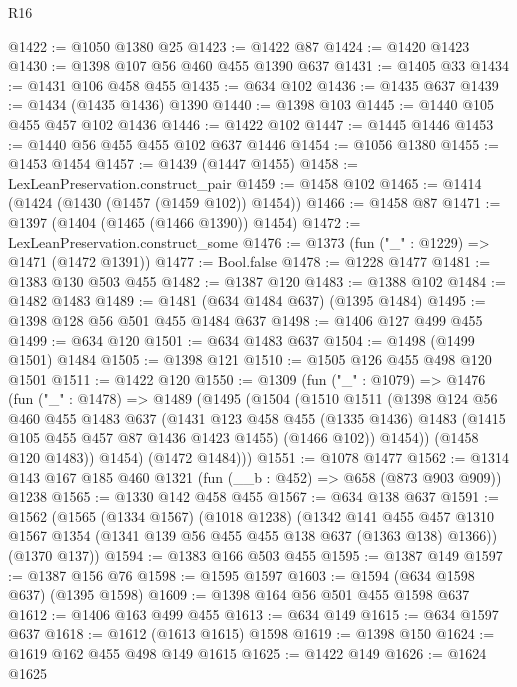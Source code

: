 \begin{lexlean}{R16}
\begin{coremodule}
@1422 := @1050 @1380 @25
@1423 := @1422 @87
@1424 := @1420 @1423
@1430 := @1398 @107 @56 @460 @455 @1390 @637
@1431 := @1405 @33
@1434 := @1431 @106 @458 @455
@1435 := @634 @102
@1436 := @1435 @637
@1439 := @1434 (@1435 @1436) @1390
@1440 := @1398 @103
@1445 := @1440 @105 @455 @457 @102 @1436
@1446 := @1422 @102
@1447 := @1445 @1446
@1453 := @1440 @56 @455 @455 @102 @637 @1446
@1454 := @1056 @1380
@1455 := @1453 @1454
@1457 := @1439 (@1447 @1455)
@1458 := LexLeanPreservation.construct_pair
@1459 := @1458 @102
@1465 := @1414 (@1424 (@1430 (@1457 (@1459 @102)) @1454))
@1466 := @1458 @87
@1471 := @1397 (@1404 (@1465 (@1466 @1390)) @1454)
@1472 := LexLeanPreservation.construct_some
@1476 := @1373 (fun ("_" : @1229) => @1471 (@1472 @1391))
@1477 := Bool.false
@1478 := @1228 @1477
@1481 := @1383 @130 @503 @455
@1482 := @1387 @120
@1483 := @1388 @102
@1484 := @1482 @1483
@1489 := @1481 (@634 @1484 @637) (@1395 @1484)
@1495 := @1398 @128 @56 @501 @455 @1484 @637
@1498 := @1406 @127 @499 @455
@1499 := @634 @120
@1501 := @634 @1483 @637
@1504 := @1498 (@1499 @1501) @1484
@1505 := @1398 @121
@1510 := @1505 @126 @455 @498 @120 @1501
@1511 := @1422 @120
@1550 := @1309
    (fun ("_" : @1079) =>
    @1476
      (fun ("_" : @1478) =>
      @1489
        (@1495
          (@1504
            (@1510
              @1511
              (@1398
                @124
                @56
                @460
                @455
                @1483
                @637
                (@1431
                  @123
                  @458
                  @455
                  (@1335 @1436)
                  @1483
                  (@1415 @105 @455 @457 @87 @1436 @1423 @1455)
                  (@1466 @102))
                @1454))
            (@1458 @120 @1483))
          @1454)
        (@1472 @1484)))
@1551 := @1078 @1477
@1562 := @1314 @143 @167 @185 @460 @1321 (fun (__b : @452) => @658 (@873 @903 @909)) @1238
@1565 := @1330 @142 @458 @455
@1567 := @634 @138 @637
@1591 := @1562
    (@1565
      (@1334 @1567)
      (@1018 @1238)
      (@1342
        @141
        @455
        @457
        @1310
        @1567
        @1354
        (@1341 @139 @56 @455 @455 @138 @637 (@1363 @138) @1366))
      (@1370 @137))
@1594 := @1383 @166 @503 @455
@1595 := @1387 @149
@1597 := @1387 @156 @76
@1598 := @1595 @1597
@1603 := @1594 (@634 @1598 @637) (@1395 @1598)
@1609 := @1398 @164 @56 @501 @455 @1598 @637
@1612 := @1406 @163 @499 @455
@1613 := @634 @149
@1615 := @634 @1597 @637
@1618 := @1612 (@1613 @1615) @1598
@1619 := @1398 @150
@1624 := @1619 @162 @455 @498 @149 @1615
@1625 := @1422 @149
@1626 := @1624 @1625

\end{coremodule}
\end{lexlean}
